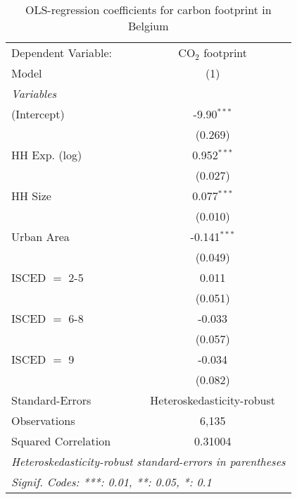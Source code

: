 
\begin{table}[htbp!]
   \centering
   \small
   \begin{adjustbox}{width = 1\textwidth, max height = 0.95\textheight, center}
      \begin{threeparttable}[b]
         \caption{\label{tab:OLS_2_BEL} OLS-regression coefficients for carbon footprint in Belgium}
         \begin{tabular}{lc}
            \tabularnewline \midrule \midrule
            Dependent Variable: & CO$_{2}$ footprint\\  
            Model               & (1)\\  
            \midrule
            \emph{Variables}\\
            (Intercept)         & -9.90$^{***}$\\   
                                & (0.269)\\   
            HH Exp. (log)       & 0.952$^{***}$\\   
                                & (0.027)\\   
            HH Size             & 0.077$^{***}$\\   
                                & (0.010)\\   
            Urban Area          & -0.141$^{***}$\\   
                                & (0.049)\\   
            ISCED $=$ 2-5       & 0.011\\   
                                & (0.051)\\   
            ISCED $=$ 6-8       & -0.033\\   
                                & (0.057)\\   
            ISCED $=$ 9         & -0.034\\   
                                & (0.082)\\   
            \midrule 
            Standard-Errors     & Heteroskedasticity-robust \\   
            Observations        & 6,135\\  
            Squared Correlation & 0.31004\\  
            \midrule \midrule
            \multicolumn{2}{l}{\emph{Heteroskedasticity-robust standard-errors in parentheses}}\\
            \multicolumn{2}{l}{\emph{Signif. Codes: ***: 0.01, **: 0.05, *: 0.1}}\\
         \end{tabular}
         

\end{threeparttable}
\end{adjustbox}
\end{table}
